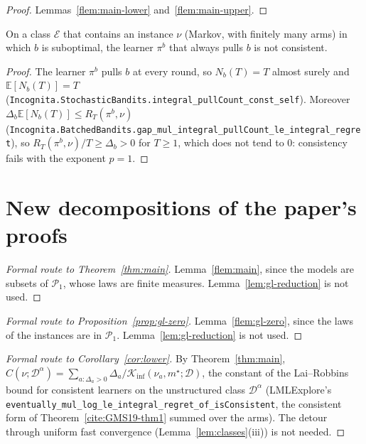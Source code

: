 \documentclass[11pt]{article}
\newcommand{\E}{\mathbb{E}}
\newcommand{\Kinf}{\mathcal{K}_{\inf}}
\newcommand{\ms}{m^{\star}}
\newcommand{\GL}{C}
\newcommand{\gap}{\Delta}
\begin{document}
\begin{proof}
Lemmas~\ref{flem:main-lower} and~\ref{flem:main-upper}.
\end{proof}

\begin{lemma}\label{flem:const-consistent}
On a class $\mathcal E$ that contains an instance $\nu$ (Markov, with finitely many arms) in which
$b$ is suboptimal, the learner $\pi^b$ that always pulls $b$ is not consistent.
\end{lemma}

\begin{proof}
The learner $\pi^b$ pulls $b$ at every round, so $N_b(T)=T$ almost surely and $\E[N_b(T)]=T$
(\texttt{Incognita.StochasticBandits.integral\_pullCount\_const\_self}). Moreover
$\gap_b\E[N_b(T)]\le R_T(\pi^b,\nu)$
(\texttt{Incognita.BatchedBandits.gap\_mul\_integral\_pullCount\_le\_integral\_regret}), so $R_T(\pi^b,\nu)/T\ge\gap_b>0$ for $T\ge1$, which does not tend to $0$: consistency fails with the
exponent $p=1$.
\end{proof}

\section{New decompositions of the paper's proofs}

\begin{proof}[Formal route to Theorem~\ref{thm:main}]
Lemma~\ref{flem:main}, since the models are subsets of $\mathcal P_1$, whose laws are finite
measures. Lemma~\ref{lem:gl-reduction} is not used.
\end{proof}

\begin{proof}[Formal route to Proposition~\ref{prop:gl-zero}]
Lemma~\ref{flem:gl-zero}, since the laws of the instances are in $\mathcal P_1$.
Lemma~\ref{lem:gl-reduction} is not used.
\end{proof}

\begin{proof}[Formal route to Corollary~\ref{cor:lower}]
By Theorem~\ref{thm:main}, $\GL(\nu;\mathcal D^\alpha)=\sum_{a:\gap_a>0}\gap_a/\Kinf(\nu_a,\ms;\mathcal D)$,
the constant of the Lai--Robbins bound for consistent learners on the unstructured class
$\mathcal D^\alpha$ (LMLExplore's
\texttt{eventually\_mul\_log\_le\_integral\_regret\_of\_isConsistent}, the consistent form of
Theorem~\ref{cite:GMS19-thm1} summed over the arms). The detour through uniform fast convergence
(Lemma~\ref{lem:classes}(iii)) is not needed.
\end{proof}
\end{document}
